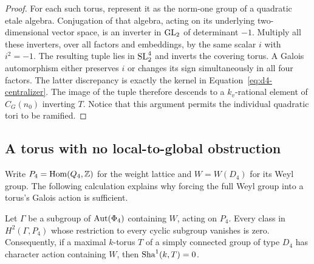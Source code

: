\begin{proof}
For each such torus, represent it as the norm-one group of a quadratic
etale algebra.  Conjugation of that algebra, acting on its underlying
two-dimensional vector space, is an inverter in $\operatorname{GL}_2$ of determinant
$-1$.  Multiply all these inverters, over all factors and embeddings,
by the same scalar $i$ with $i^2=-1$.  The resulting tuple lies in
$\operatorname{SL}_2^4$ and inverts the covering torus.  A Galois automorphism either
preserves $i$ or changes its sign simultaneously in all four factors.
The latter discrepancy is exactly the kernel in
Equation~\eqref{eq:d4-centralizer}.  The image of the tuple therefore
descends to a $k_v$-rational element of $C_G(n_0)$ inverting $T$.  Notice
that this argument permits the individual quadratic tori to be ramified.
\end{proof}

\subsection{A torus with no local-to-global obstruction}

Write $P_4=\operatorname{Hom}(Q_4,\mathbb Z)$ for the weight lattice and
$W=W(D_4)$ for its Weyl group.  The following calculation explains why
forcing the full Weyl group into a torus's Galois action is sufficient.

\begin{lemma}\label{lem:d4-cyclic-cohomology}
Let $\Gamma$ be a subgroup of $\operatorname{Aut}(\Phi_4)$ containing $W$, acting on
$P_4$.  Every class in $H^2(\Gamma,P_4)$ whose restriction to every cyclic
subgroup vanishes is zero.  Consequently, if a maximal $k$-torus $T$ of
a simply connected group of type $D_4$ has character action containing
$W$, then $\operatorname{Sha}^1(k,T)=0$.
\end{lemma}

